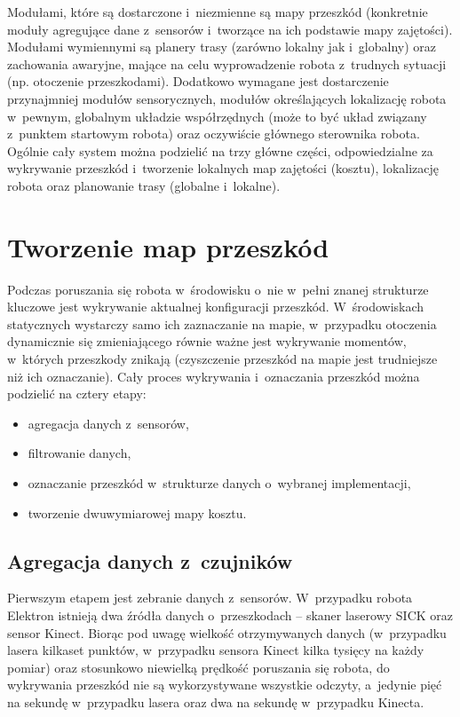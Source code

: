 Modułami, które są dostarczone i~niezmienne są mapy przeszkód (konkretnie
moduły agregujące dane z~sensorów i~tworzące na ich podstawie mapy zajętości).
Modułami wymiennymi są planery trasy (zarówno lokalny jak i~globalny) oraz
zachowania awaryjne, mające na celu wyprowadzenie robota z~trudnych sytuacji
(np. otoczenie przeszkodami). Dodatkowo wymagane jest dostarczenie przynajmniej
modułów sensorycznych, modułów określających lokalizację robota w~pewnym,
globalnym układzie współrzędnych (może to być układ związany z~punktem startowym
robota) oraz oczywiście głównego sterownika robota. Ogólnie cały system można
podzielić na trzy główne części, odpowiedzialne za wykrywanie przeszkód
i~tworzenie lokalnych map zajętości (kosztu), lokalizację robota oraz planowanie
trasy (globalne i~lokalne).

\section{Tworzenie map przeszkód}

Podczas poruszania się robota w~środowisku o~nie w~pełni znanej strukturze
kluczowe jest wykrywanie aktualnej konfiguracji przeszkód. W~środowiskach
statycznych wystarczy samo ich zaznaczanie na mapie, w~przypadku otoczenia
dynamicznie się zmieniającego równie ważne jest wykrywanie momentów, w~których
przeszkody znikają (czyszczenie przeszkód na mapie jest trudniejsze niż ich
oznaczanie). Cały proces wykrywania i~oznaczania przeszkód można podzielić na
cztery etapy:

\begin{itemize}
  \item agregacja danych z~sensorów,
  \item filtrowanie danych,
  \item oznaczanie przeszkód w~strukturze danych o~wybranej implementacji,
  \item tworzenie dwuwymiarowej mapy kosztu.
\end{itemize}

\subsection{Agregacja danych z~czujników}

Pierwszym etapem jest zebranie danych z~sensorów. W~przypadku robota Elektron
istnieją dwa źródła danych o~przeszkodach -- skaner laserowy SICK oraz sensor
Kinect. Biorąc pod uwagę wielkość otrzymywanych danych (w~przypadku lasera
kilkaset punktów, w~przypadku sensora Kinect kilka tysięcy na każdy pomiar) oraz
stosunkowo niewielką prędkość poruszania się robota, do wykrywania przeszkód
nie są wykorzystywane wszystkie odczyty, a~jedynie pięć na sekundę w~przypadku
lasera oraz dwa na sekundę w~przypadku Kinecta.

